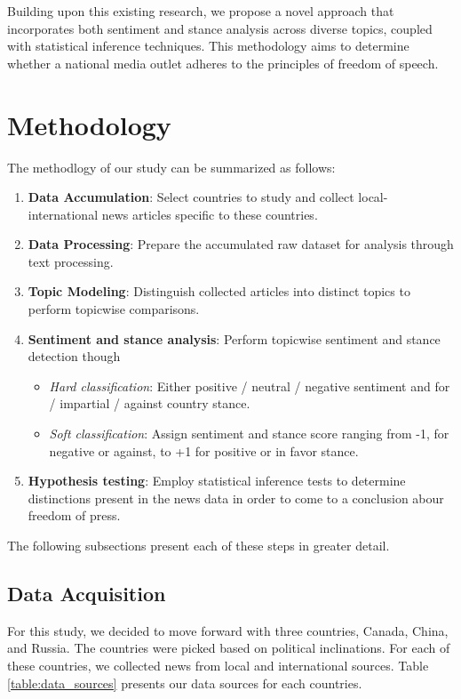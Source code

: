 \documentclass{article}
\theoremstyle{mytheoremstyle}
\theoremstyle{mytheoremstyle}
\theoremstyle{myproblemstyle}
\begin{document}
    Building upon this existing research, we propose a novel approach that incorporates both sentiment and stance analysis across diverse topics, coupled with statistical inference techniques. This methodology aims to determine whether a national media outlet adheres to the principles of freedom of speech.

    \section{Methodology}

    The methodlogy of our study can be summarized as follows:

    \begin{enumerate}
        \item \textbf{Data Accumulation}: Select countries to study and collect local-international news articles specific to these countries.
        \item \textbf{Data Processing}: Prepare the accumulated raw dataset for analysis through text processing.
        \item \textbf{Topic Modeling}: Distinguish collected articles into distinct topics to perform topicwise comparisons.
        \item \textbf{Sentiment and stance analysis}: Perform topicwise sentiment and stance detection though \begin{itemize}
            \item \emph{Hard classification}: Either positive / neutral / negative sentiment and for / impartial / against country stance.
            \item \emph{Soft classification}: Assign sentiment and stance score ranging from -1, for negative or against, to +1 for positive or in favor stance.
        \end{itemize}
        \item \textbf{Hypothesis testing}: Employ statistical inference tests to determine distinctions present in the news data in order to come to a conclusion abour freedom of press.
    \end{enumerate}

    The following subsections present each of these steps in greater detail.

    \subsection{Data Acquisition}

    For this study, we decided to move forward with three countries, Canada, China, and Russia. The countries were picked based on political inclinations. For each of these countries, we collected news from local and international sources. Table \ref{table:data_sources} presents our data sources for each countries.
\end{document}
